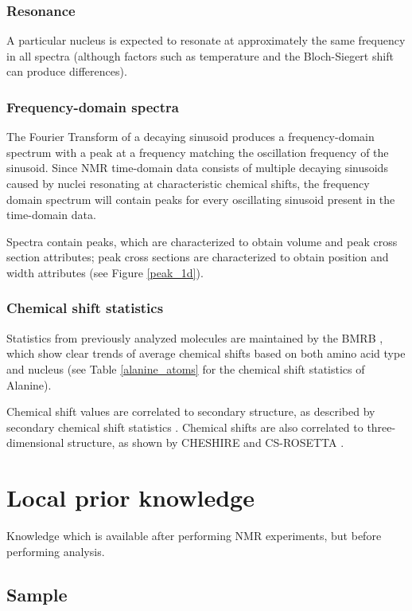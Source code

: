 \subsubsection{Resonance}
A particular nucleus is expected to resonate at approximately the same 
frequency in all spectra (although factors such as temperature and the 
Bloch-Siegert shift can produce differences).

\subsubsection{Frequency-domain spectra}
The Fourier Transform of a decaying sinusoid produces a frequency-domain 
spectrum with a peak at a frequency matching the oscillation frequency of 
the sinusoid.  Since NMR time-domain data consists of multiple decaying 
sinusoids caused by nuclei resonating at characteristic chemical shifts, 
the frequency domain spectrum will contain peaks for every oscillating 
sinusoid present in the time-domain data.  

Spectra contain peaks, which are characterized to obtain volume and peak
cross section attributes; peak cross sections are characterized to obtain 
position and width attributes (see Figure \ref{peak_1d}).

\subsubsection{Chemical shift statistics}
Statistics from previously analyzed molecules are maintained by the BMRB
\cite{bmrb}, which show clear trends of average chemical shifts based on
both amino acid type and nucleus (see Table \ref{alanine_atoms} for the 
chemical shift statistics of Alanine).

Chemical shift values are correlated to secondary structure, as described
by secondary chemical shift statistics \cite{spera1991empirical}.  Chemical 
shifts are also correlated to three-dimensional structure, as shown by 
CHESHIRE \cite{cheshire} and CS-ROSETTA \cite{cs-rosetta}.  


\section{Local prior knowledge}
Knowledge which is available after performing NMR experiments, but before
performing analysis.

\subsection*{Sample}

